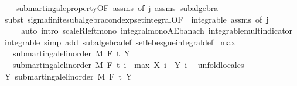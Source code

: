 \begin{isabellebody}
\isadelimproof
\ \ %
\endisadelimproof
%
\isatagproof
{}\isamarkupfalse%
\ submartingale{\isacharunderscore}{\kern0pt}property{\isacharbrackleft}{\kern0pt}OF\ assms{\isacharparenleft}{\kern0pt}{}{\isacharparenright}{\kern0pt}{\isacharcomma}{\kern0pt}\ of\ j{\isacharbrackright}{\kern0pt}\ assms\ subalgebra\isanewline
\ \ \isamarkupfalse%
\ {\isacharparenleft}{\kern0pt}subst\ sigma{\isacharunderscore}{\kern0pt}finite{\isacharunderscore}{\kern0pt}subalgebra{\isachardot}{\kern0pt}cond{\isacharunderscore}{\kern0pt}exp{\isacharunderscore}{\kern0pt}set{\isacharunderscore}{\kern0pt}integral{\isacharbrackleft}{\kern0pt}OF\ {\isacharunderscore}{\kern0pt}\ integrable\ assms{\isacharparenleft}{\kern0pt}{}{\isacharparenright}{\kern0pt}{\isacharcomma}{\kern0pt}\ of\ j{\isacharbrackright}{\kern0pt}{\isacharparenright}{\kern0pt}\isanewline
\ \ \ \ \ {\isacharparenleft}{\kern0pt}auto\ intro{\isacharbang}{\kern0pt}{\isacharcolon}{\kern0pt}\ scaleR{\isacharunderscore}{\kern0pt}left{\isacharunderscore}{\kern0pt}mono\ integral{\isacharunderscore}{\kern0pt}mono{\isacharunderscore}{\kern0pt}AE{\isacharunderscore}{\kern0pt}banach\ integrable{\isacharunderscore}{\kern0pt}mult{\isacharunderscore}{\kern0pt}indicator\ integrable\ simp\ add{\isacharcolon}{\kern0pt}\ subalgebra{\isacharunderscore}{\kern0pt}def\ set{\isacharunderscore}{\kern0pt}lebesgue{\isacharunderscore}{\kern0pt}integral{\isacharunderscore}{\kern0pt}def{\isacharparenright}{\kern0pt}%
\endisatagproof
{\isafoldproof}%
%
\isadelimproof
\isanewline
%
\endisadelimproof
\isanewline
{}\isamarkupfalse%
\ max{\isacharcolon}{\kern0pt}\isanewline
\ \ \ {\isachardoublequoteopen}submartingale{\isacharunderscore}{\kern0pt}linorder\ M\ F\ t\ Y{\isachardoublequoteclose}\isanewline
\ \ \ {\isachardoublequoteopen}submartingale{\isacharunderscore}{\kern0pt}linorder\ M\ F\ t\ {\isacharparenleft}{\kern0pt}{\isasymlambda}i\ {\isasymxi}{\isachardot}{\kern0pt}\ max\ {\isacharparenleft}{\kern0pt}X\ i\ {\isasymxi}{\isacharparenright}{\kern0pt}\ {\isacharparenleft}{\kern0pt}Y\ i\ {\isasymxi}{\isacharparenright}{\kern0pt}{\isacharparenright}{\kern0pt}{\isachardoublequoteclose}\isanewline
%
\isadelimproof
%
\endisadelimproof
%
\isatagproof
{}\isamarkupfalse%
\ {\isacharparenleft}{\kern0pt}unfold{\isacharunderscore}{\kern0pt}locales{\isacharparenright}{\kern0pt}\isanewline
\ \ \isamarkupfalse%
\ Y{\isacharcolon}{\kern0pt}\ submartingale{\isacharunderscore}{\kern0pt}linorder\ M\ F\ t\ Y\ \isamarkupfalse%

\end{isabellebody}
